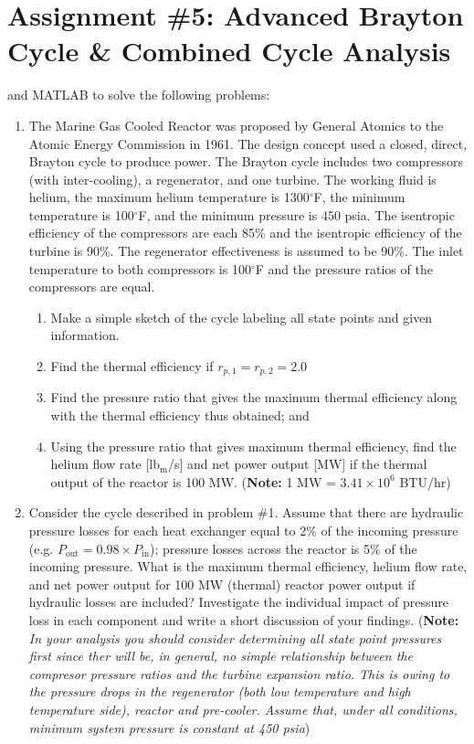 \chapter{Assignment \#5: Advanced Brayton Cycle \& Combined Cycle Analysis}
\label{ch:ass5}

 and MATLAB to solve the following problems:

\begin{fullwidth}
\begin{enumerate}
\item The Marine Gas Cooled Reactor was proposed by General Atomics to the Atomic Energy Commission in 1961.  The design concept used a closed, direct, Brayton cycle to produce power. The Brayton cycle includes two compressors (with inter-cooling), a regenerator, and one turbine.  The working fluid is helium, the maximum helium temperature is 1300$^{\circ}$F, the minimum temperature is 100$^{\circ}$F, and the minimum pressure is 450 psia.  The isentropic efficiency of the compressors are each 85\% and the isentropic efficiency of the turbine is 90\%.  The regenerator effectiveness is assumed to be 90\%.  The inlet temperature to both compressors is 100$^{\circ}$F and the pressure ratios of the compressors are equal.
\begin{enumerate}
\item Make a simple sketch of the cycle labeling all state points and given information.
\item Find the thermal efficiency if $r_{p,1} = r_{p,2}=2.0$
\item Find the pressure ratio that gives the maximum thermal efficiency along with the thermal efficiency thus obtained; and
\item Using the pressure ratio that gives maximum thermal efficiency, find the helium flow rate [lb$_{\text{m}}$/s] and net power output [MW] if the thermal output of the reactor is 100 MW. (\textbf{Note:} 1 MW = $3.41 \times 10^6$ BTU/hr)
\end{enumerate}

\vspace{1.0cm}
\item Consider the cycle described in problem \#1.  Assume that there are hydraulic pressure losses for each heat exchanger equal to 2\% of the incoming pressure (e.g. $P_{\text{out}} = 0.98 \times P_{\text{in}}$); pressure losses across the reactor is 5\% of the incoming pressure.  What is the maximum thermal efficiency, helium flow rate, and net power output for 100 MW (thermal) reactor power output if hydraulic losses are included?  Investigate the individual impact of pressure loss in each component and write a short discussion of your findings. (\textbf{Note:} \emph{In your analysis you should consider determining all state point pressures first since ther will be, in general, no simple relationship between the compresor pressure ratios and the turbine expansion ratio.  This is owing to the pressure drops in the regenerator (both low temperature and high temperature side), reactor and pre-cooler.  Assume that, under all conditions, minimum system pressure is constant at 450 psia})


\end{enumerate}
\end{fullwidth}
